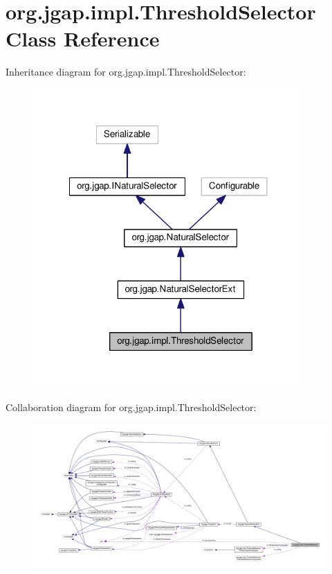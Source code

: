 \hypertarget{classorg_1_1jgap_1_1impl_1_1_threshold_selector}{\section{org.\-jgap.\-impl.\-Threshold\-Selector Class Reference}
\label{classorg_1_1jgap_1_1impl_1_1_threshold_selector}
}


Inheritance diagram for org.\-jgap.\-impl.\-Threshold\-Selector\-:
\nopagebreak
\begin{figure}[H]
\begin{center}
\leavevmode
\includegraphics[width=293pt]{classorg_1_1jgap_1_1impl_1_1_threshold_selector__inherit__graph}
\end{center}
\end{figure}


Collaboration diagram for org.\-jgap.\-impl.\-Threshold\-Selector\-:
\nopagebreak
\begin{figure}[H]
\begin{center}
\leavevmode
\includegraphics[width=350pt]{classorg_1_1jgap_1_1impl_1_1_threshold_selector__coll__graph}
\end{center}
\end{figure}
